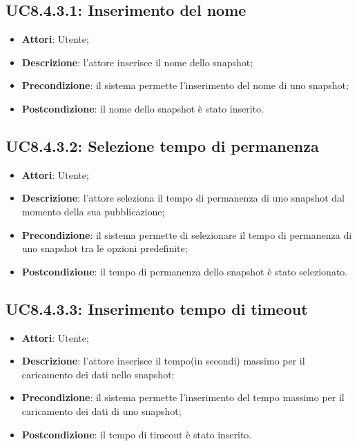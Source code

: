 \subsection{UC8.4.3.1: Inserimento del nome}
\hypertarget{UC8.4.3.1}{}
\begin{itemize}
	\item \textbf{Attori}: Utente;
	\item \textbf{Descrizione}: l'attore inserisce il nome dello snapshot;
	\item \textbf{Precondizione}: il sistema permette l'inserimento del nome di uno snapshot;
	\item \textbf{Postcondizione}: il nome dello snapshot è stato inserito.
\end{itemize}

\subsection{UC8.4.3.2: Selezione tempo di permanenza}
\hypertarget{UC8.4.3.2}{}
\begin{itemize}
	\item \textbf{Attori}: Utente;
	\item \textbf{Descrizione}: l'attore seleziona il tempo di permanenza di uno snapshot dal momento della sua pubblicazione;
	\item \textbf{Precondizione}: il sistema permette di selezionare il tempo di permanenza di uno snapshot tra le opzioni predefinite;
	\item \textbf{Postcondizione}: il tempo di permanenza dello snapshot è stato selezionato.
\end{itemize}

\subsection{UC8.4.3.3: Inserimento tempo di timeout}
\hypertarget{UC8.4.3.3}{}
\begin{itemize}
	\item \textbf{Attori}: Utente;
	\item \textbf{Descrizione}: l'attore inserisce il tempo(in secondi) massimo per il caricamento dei dati nello snapshot;
	\item \textbf{Precondizione}: il sistema permette l'inserimento del tempo massimo per il caricamento dei dati di uno snapshot;
	\item \textbf{Postcondizione}: il tempo di timeout è stato inserito.
\end{itemize}

\pagebreak




